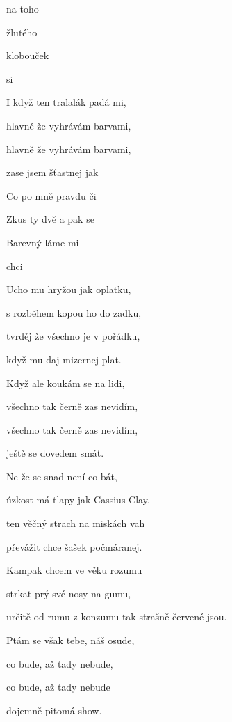 

\zs

 na toho 

 žlutého 

 klobouček 

 si   
\ks

\zs
I když ten tralalák padá mi,

hlavně že vyhrávám barvami,

hlavně že vyhrávám barvami,

zase jsem šťastnej jak   
\ks

\zr
Co po mně  pravdu či 

Zkus ty dvě  a pak se 

Barevný  láme mi 

 chci  
\kr

\zs
Ucho mu hryžou jak oplatku,

s rozběhem kopou ho do zadku,

tvrděj že všechno je v pořádku,

když mu daj mizernej plat.
\ks

\zs
Když ale koukám se na lidi,

všechno tak černě zas nevidím,

všechno tak černě zas nevidím,

ještě se dovedem smát.
\ks

\zr
Ne že se snad není co bát,

úzkost má tlapy jak Cassius Clay,

ten věčný strach na miskách vah

převážit chce šašek počmáranej.
\kr

\zs
Kampak chcem ve věku rozumu

strkat prý své nosy na gumu,

určitě od rumu z konzumu tak strašně červené jsou.
\ks

\zs
Ptám se však tebe, náš osude,

co bude, až tady nebude,

co bude, až tady nebude

dojemně pitomá show.
\ks

